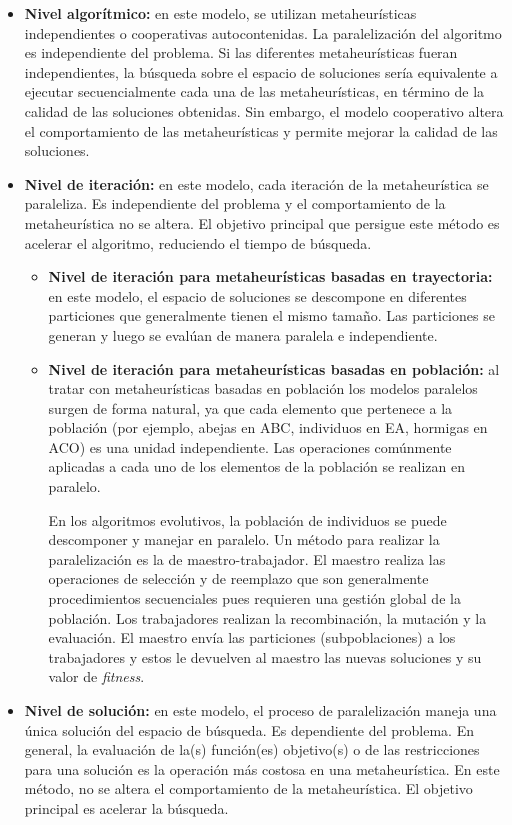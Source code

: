 \begin{itemize}
    \item \textbf{Nivel algorítmico:} en este modelo, se utilizan metaheurísticas independientes o cooperativas autocontenidas. La paralelización del algoritmo es independiente del problema. Si las diferentes metaheurísticas fueran independientes, la búsqueda sobre el espacio de soluciones sería equivalente a ejecutar secuencialmente cada una de las metaheurísticas, en término de la calidad de las soluciones obtenidas. Sin embargo, el modelo cooperativo altera el comportamiento de las metaheurísticas y permite mejorar la calidad de las soluciones. 
    
    \item \textbf{Nivel de iteración:} en este modelo, cada iteración de la metaheurística se paraleliza. Es independiente del problema y el comportamiento de la metaheurística no se altera. El objetivo principal que persigue este método es acelerar el algoritmo, reduciendo el tiempo de búsqueda.
    
    \begin{itemize}
    \item \textbf{Nivel de iteración para metaheurísticas basadas en trayectoria:} en este modelo, el espacio de soluciones se descompone en diferentes particiones que generalmente tienen el mismo tamaño. Las particiones se generan y luego se evalúan de manera paralela e independiente. 
    
    \item \textbf{Nivel de iteración para metaheurísticas basadas en población:} al tratar con metaheurísticas basadas en población los modelos paralelos surgen de forma natural, ya que cada elemento que pertenece a la población (por ejemplo, abejas en ABC, individuos en EA, hormigas en ACO) es una unidad independiente. Las operaciones comúnmente aplicadas a cada uno de los elementos de la población se realizan en paralelo.
    
    En los algoritmos evolutivos, la población de individuos se puede descomponer y manejar en paralelo. Un método para realizar la paralelización es la de maestro-trabajador. El maestro realiza las operaciones de selección y de reemplazo que son generalmente procedimientos secuenciales pues requieren una gestión global de la población. Los trabajadores realizan la recombinación, la mutación y la evaluación. El maestro envía las particiones (subpoblaciones) a los trabajadores y estos le devuelven al maestro las nuevas soluciones y su valor de \textit{fitness}.
    \end{itemize}
    
    \item \textbf{Nivel de solución:} en este modelo, el proceso de paralelización maneja una única solución del espacio de búsqueda. Es dependiente del problema. En general, la evaluación de la(s) función(es) objetivo(s) o de las restricciones para una solución es la operación más costosa en una metaheurística. En este método, no se altera el comportamiento de la metaheurística. El objetivo principal es acelerar la búsqueda.
    
\end{itemize}
